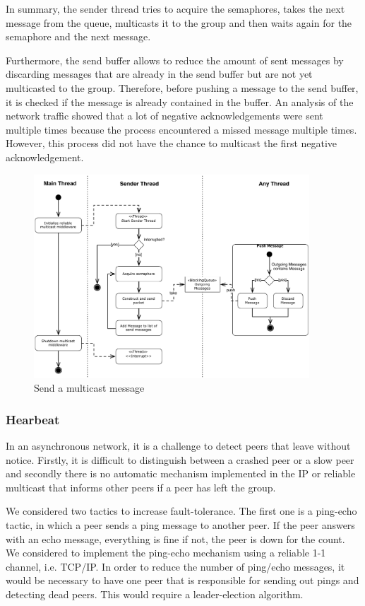 In summary, the sender thread tries to acquire the semaphores, takes the next message from the queue, multicasts it to the group and then waits again for the semaphore and the next message. 

Furthermore, the send buffer allows to reduce the amount of sent messages by discarding messages that are already in the send buffer but are not yet multicasted to the group. Therefore, before pushing a message to the send buffer, it is checked if the message is already contained in the buffer.
An analysis of the network traffic showed that a lot of negative acknowledgements were sent multiple times because the process encountered a missed message multiple times. However, this process did not have the chance to multicast the first negative acknowledgement.

\begin{figure}[htbp]
    \centering
        \includegraphics[height=3in]{figures/sendMessage.pdf}
    \caption{Send a multicast message}
    \label{fig:sendMessage}
\end{figure}
  
\subsubsection{Hearbeat}
In an asynchronous network, it is a challenge to detect peers that leave without notice. Firstly, it is difficult to distinguish between a crashed peer or a slow peer and secondly there is no automatic mechanism implemented in the IP or reliable multicast that informs other peers if a peer has left the group.

We considered two tactics to increase fault-tolerance. The first one is a ping-echo tactic, in which a peer sends a ping message to another peer. If the peer answers with an echo message, everything is fine if not, the peer is down for the count. We considered to implement the ping-echo mechanism using a reliable 1-1 channel, i.e. TCP/IP. In order to reduce the number of ping/echo messages, it would be necessary to have one peer that is responsible for sending out pings and detecting dead peers. This would require a leader-election algorithm.

